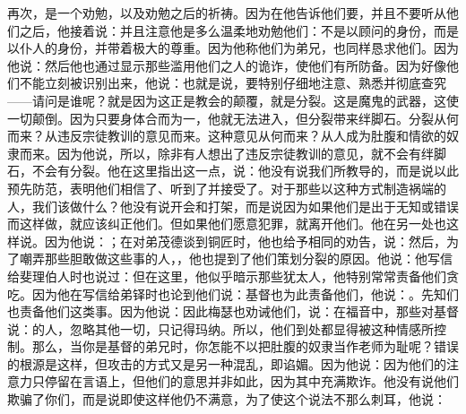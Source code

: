 再次，是一个劝勉，以及劝勉之后的祈祷。因为在他告诉他们要，并且不要听从他们之后，他接着说：并且注意他是多么温柔地劝勉他们：不是以顾问的身份，而是以仆人的身份，并带着极大的尊重。因为他称他们为弟兄，也同样恳求他们。因为他说：然后他也通过显示那些滥用他们之人的诡诈，使他们有所防备。因为好像他们不能立刻被识别出来，他说：也就是说，要特别仔细地注意、熟悉并彻底查究——请问是谁呢？就是因为这正是教会的颠覆，就是分裂。这是魔鬼的武器，这使一切颠倒。因为只要身体合而为一，他就无法进入，但分裂带来绊脚石。分裂从何而来？从违反宗徒教训的意见而来。这种意见从何而来？从人成为肚腹和情欲的奴隶而来。因为他说，所以，除非有人想出了违反宗徒教训的意见，就不会有绊脚石，不会有分裂。他在这里指出这一点，说：他没有说我们所教导的，而是说以此预先防范，表明他们相信了、听到了并接受了。对于那些以这种方式制造祸端的人，我们该做什么？他没有说开会和打架，而是说因为如果他们是出于无知或错误而这样做，就应该纠正他们。但如果他们愿意犯罪，就离开他们。他在另一处也这样说。因为他说：；在对弟茂德谈到铜匠时，他也给予相同的劝告，说：然后，为了嘲弄那些胆敢做这些事的人，，他也提到了他们策划分裂的原因。他说：他写信给斐理伯人时也说过：但在这里，他似乎暗示那些犹太人，他特别常常责备他们贪吃。因为他在写信给弟铎时也论到他们说：基督也为此责备他们，他说：。先知们也责备他们这类事。因为他说：因此梅瑟也劝诫他们，说：在福音中，那些对基督说：的人，忽略其他一切，只记得玛纳。所以，他们到处都显得被这种情感所控制。那么，当你是基督的弟兄时，你怎能不以把肚腹的奴隶当作老师为耻呢？错误的根源是这样，但攻击的方式又是另一种混乱，即谄媚。因为他说：因为他们的注意力只停留在言语上，但他们的意思并非如此，因为其中充满欺诈。他没有说他们欺骗了你们，而是说即使这样他仍不满意，为了使这个说法不那么刺耳，他说：\par

